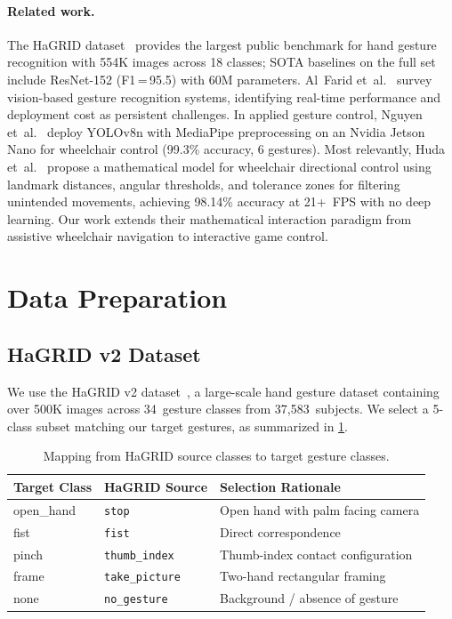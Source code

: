 \documentclass[11pt,a4paper]{article}
\begin{document}
\paragraph{Related work.}
The HaGRID dataset~\citep{hagrid2022} provides the largest public benchmark for hand gesture recognition with 554K images across 18 classes; SOTA baselines on the full set include ResNet-152 (F1\,=\,95.5) with 60M parameters. Al~Farid et~al.~\citep{alfarid2022survey} survey vision-based gesture recognition systems, identifying real-time performance and deployment cost as persistent challenges. In applied gesture control, Nguyen et~al.~\citep{nguyen2025wheelchair} deploy YOLOv8n with MediaPipe preprocessing on an Nvidia Jetson Nano for wheelchair control (99.3\% accuracy, 6 gestures). Most relevantly, Huda et~al.~\citep{huda2025wheelchair} propose a mathematical model for wheelchair directional control using landmark distances, angular thresholds, and tolerance zones for filtering unintended movements, achieving 98.14\% accuracy at 21+~FPS with no deep learning. Our work extends their mathematical interaction paradigm from assistive wheelchair navigation to interactive game control.


\section{Data Preparation}
\label{sec:data}

\subsection{HaGRID v2 Dataset}

We use the HaGRID v2 dataset~\citep{hagrid2022}, a large-scale hand gesture dataset containing over 500K images across 34~gesture classes from 37{,}583~subjects. We select a 5-class subset matching our target gestures, as summarized in \cref{tab:mapping}.

\begin{table}[htbp]
\centering
\caption{Mapping from HaGRID source classes to target gesture classes.}
\label{tab:mapping}
\begin{tabular}{@{}lll@{}}
\toprule
\textbf{Target Class} & \textbf{HaGRID Source} & \textbf{Selection Rationale} \\
\midrule
open\_hand & \texttt{stop} & Open hand with palm facing camera \\
fist       & \texttt{fist} & Direct correspondence \\
pinch      & \texttt{thumb\_index} & Thumb-index contact configuration \\
frame      & \texttt{take\_picture} & Two-hand rectangular framing \\
none       & \texttt{no\_gesture} & Background / absence of gesture \\
\bottomrule
\end{tabular}
\end{table}
\end{document}
